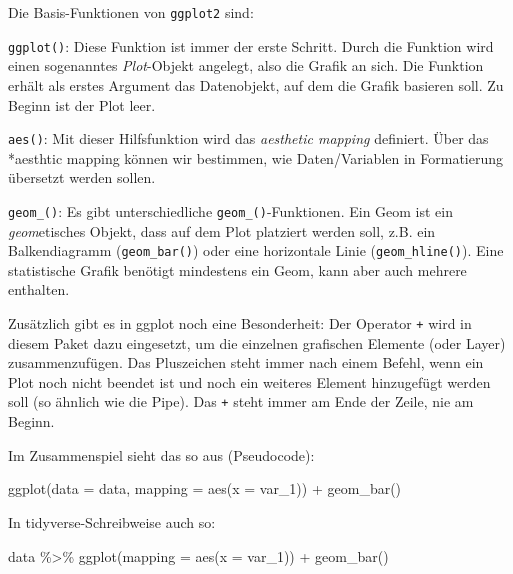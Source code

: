 \documentclass[
]{book}
\newenvironment{Shaded}{\begin{snugshade}}{\end{snugshade}}
\newcommand{\AttributeTok}[1]{\textcolor[rgb]{0.77,0.63,0.00}{#1}}
\newcommand{\FunctionTok}[1]{\textcolor[rgb]{0.00,0.00,0.00}{#1}}
\newcommand{\NormalTok}[1]{#1}
\newcommand{\SpecialCharTok}[1]{\textcolor[rgb]{0.00,0.00,0.00}{#1}}
\begin{document}
Die Basis-Funktionen von \texttt{ggplot2} sind:

\texttt{ggplot()}: Diese Funktion ist immer der erste Schritt. Durch die Funktion wird einen sogenanntes \emph{Plot}-Objekt angelegt, also die Grafik an sich. Die Funktion erhält als erstes Argument das Datenobjekt, auf dem die Grafik basieren soll. Zu Beginn ist der Plot leer.

\texttt{aes()}: Mit dieser Hilfsfunktion wird das \emph{aesthetic mapping} definiert. Über das *aesthtic mapping können wir bestimmen, wie Daten/Variablen in Formatierung übersetzt werden sollen.

\texttt{geom\_()}: Es gibt unterschiedliche \texttt{geom\_()}-Funktionen. Ein Geom ist ein \emph{geom}etisches Objekt, dass auf dem Plot platziert werden soll, z.B. ein Balkendiagramm (\texttt{geom\_bar()}) oder eine horizontale Linie (\texttt{geom\_hline()}). Eine statistische Grafik benötigt mindestens ein Geom, kann aber auch mehrere enthalten.

Zusätzlich gibt es in ggplot noch eine Besonderheit: Der Operator \texttt{+} wird in diesem Paket dazu eingesetzt, um die einzelnen grafischen Elemente (oder Layer) zusammenzufügen. Das Pluszeichen steht immer nach einem Befehl, wenn ein Plot noch nicht beendet ist und noch ein weiteres Element hinzugefügt werden soll (so ähnlich wie die Pipe). Das \texttt{+} steht immer am Ende der Zeile, nie am Beginn.

Im Zusammenspiel sieht das so aus (Pseudocode):

\begin{Shaded}
\begin{Highlighting}[]
\FunctionTok{ggplot}\NormalTok{(}\AttributeTok{data =}\NormalTok{ data, }\AttributeTok{mapping =} \FunctionTok{aes}\NormalTok{(}\AttributeTok{x =}\NormalTok{ var\_1)) }\SpecialCharTok{+}
  \FunctionTok{geom\_bar}\NormalTok{()}
\end{Highlighting}
\end{Shaded}

In tidyverse-Schreibweise auch so:

\begin{Shaded}
\begin{Highlighting}[]
\NormalTok{data }\SpecialCharTok{\%\textgreater{}\%} 
  \FunctionTok{ggplot}\NormalTok{(}\AttributeTok{mapping =} \FunctionTok{aes}\NormalTok{(}\AttributeTok{x =}\NormalTok{ var\_1)) }\SpecialCharTok{+}
  \FunctionTok{geom\_bar}\NormalTok{()}
\end{Highlighting}
\end{Shaded}
\end{document}
